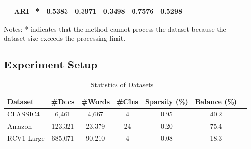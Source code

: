 \documentclass[journal]{IEEEtran}
\renewcommand{\cite}[1]{~\autocite{#1}}
\begin{document}
\begin{table}[htbp]
\begin{tabular}{@{} l c cccccc @{}}
                                    & ARI                     & *                                                & 0.5383                                         & 0.3971                                           & 0.3498                                    & \textbf{0.7576}        & 0.5298                   \\
        \bottomrule
    \end{tabular}
    \begin{tablenotes}
        \small
        \item Notes: * indicates that the method cannot process the dataset because the dataset size exceeds the processing limit.
    \end{tablenotes}
\end{table}


\subsection{Experiment Setup}

\begin{table}[h]
    \centering
    \caption{Statistics of Datasets~\cite{role2019CoClustPythonPackage}}
    \label{tab:dataset-statistics}
    \begin{tabular}{lccc@{}c@{}c@{}c}
        \hline
        \textbf{Dataset} & \textbf{\#Docs} & \textbf{\#Words} & \textbf{\#Clus} & \textbf{Sparsity (\%)} & \textbf{Balance (\%)} \\
        \hline
        CLASSIC4         & 6,461           & 4,667            & 4               & 0.95                   & 40.2                  \\
        Amazon           & 123,321         & 23,379           & 24              & 0.20                   & 75.4                  \\
        RCV1-Large       & 685,071         & 90,210           & 4               & 0.08                   & 18.3                  \\
        \hline
    \end{tabular}
\end{table}
\end{document}
